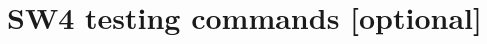 \documentclass[11pt]{report}
\begin{document}



\section{SW4 testing commands [optional]}

\end{document}
